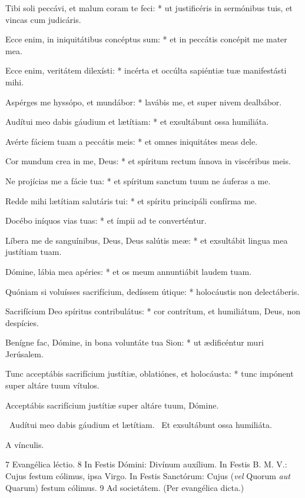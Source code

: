 Tibi soli peccávi, et malum coram te feci: * ut justificéris in sermónibus tuis, et vincas cum judicáris.

Ecce enim, in iniquitátibus concéptus sum: * et in peccátis concépit me mater mea.

Ecce enim, veritátem dilexísti: * incérta et occúlta sapiéntiæ tuæ manifestásti mihi.

Aspérges me hyssópo, et mundábor: * lavábis me, et super nivem dealbábor.

Audítui meo dabis gáudium et lætítiam: * et exsultábunt ossa humiliáta.

Avérte fáciem tuam a peccátis meis: * et omnes iniquitátes meas dele.

Cor mundum crea in me, Deus: * et spíritum rectum ínnova in viscéribus meis.

Ne projícias me a fácie tua: * et spíritum sanctum tuum ne áuferas a me.

Redde mihi lætítiam salutáris tui: * et spíritu principáli confírma me.

Docébo iníquos vias tuas: * et ímpii ad te converténtur.

Líbera me de sanguínibus, Deus, Deus salútis meæ: * et exsultábit lingua mea justítiam tuam.

Dómine, lábia mea apéries: * et os meum annuntiábit laudem tuam.

Quóniam si voluísses sacrifícium, dedíssem útique: * holocáustis non delectáberis.

Sacrifícium Deo spíritus contribulátus: * cor contrítum, et humiliátum, Deus, non despícies.

Benígne fac, Dómine, in bona voluntáte tua Sion: * ut ædificéntur muri Jerúsalem.

Tunc acceptábis sacrifícium justítiæ, oblatiónes, et holocáusta: * tunc impónent super altáre tuum vítulos.

 Acceptábis sacrifícium justítiæ super altáre tuum, Dómine.


\V\ Audítui meo dabis gáudium et lætítiam. \R\ Et exsultábunt ossa humiliáta.


 A vínculis.

 7 Evangélica léctio. 8 In Festis Dómini: Divínum auxílium. In Festis B. M. V.: Cujus festum cólimus, ipsa Virgo. In Festis Sanctórum: Cujus (\textit{vel} Quorum \textit{aut} Quarum) festum cólimus. 9 Ad societátem. (Per evangélica dicta.)

